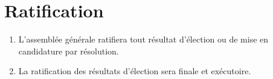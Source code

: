 \section{Ratification}
\label{ratification}

\begin{enumerate}
 \item L'assemblée générale ratifiera tout résultat d'élection ou de mise en candidature par résolution.
 \item La ratification des résultats d'élection sera finale et exécutoire.
\end{enumerate}
